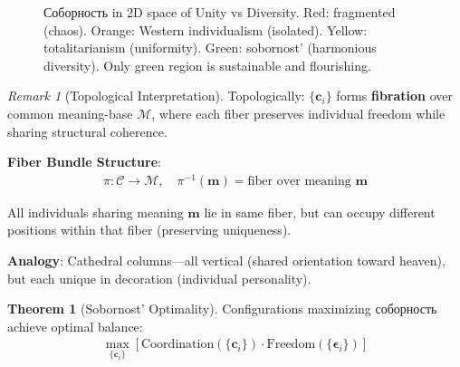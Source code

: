 \documentclass[11pt,a4paper]{article}
\theoremstyle{definition}
\newtheorem{theorem}{Theorem}[section]
\theoremstyle{remark}
\newtheorem{remark}{Remark}[section]
\newcommand{\CC}{\mathcal{C}}
\newcommand{\cc}{\mathbf{c}}
\begin{document}
\begin{enumerate}
\begin{figure}[H]
\caption{Соборность in 2D space of Unity vs Diversity. Red: fragmented (chaos). Orange: Western individualism (isolated). Yellow: totalitarianism (uniformity). Green: sobornost' (harmonious diversity). Only green region is sustainable and flourishing.}
\label{fig:sobornost_space}
\end{figure}

\begin{remark}[Topological Interpretation]
Topologically: \(\{\cc_i\}\) forms \textbf{fibration} over common meaning-base \(\mathcal{M}\), where each fiber preserves individual freedom while sharing structural coherence.

\textbf{Fiber Bundle Structure}:
\begin{align}
\pi: \CC \to \mathcal{M}, \quad \pi^{-1}(\mathbf{m}) = \text{fiber over meaning } \mathbf{m}
\end{align}

All individuals sharing meaning \(\mathbf{m}\) lie in same fiber, but can occupy different positions within that fiber (preserving uniqueness).

\textbf{Analogy}: Cathedral columns—all vertical (shared orientation toward heaven), but each unique in decoration (individual personality).
\end{remark}

\begin{theorem}[Sobornost' Optimality]
Configurations maximizing соборность achieve optimal balance:
\begin{align}
\max_{\{\cc_i\}} \left[ \text{Coordination}(\{\cc_i\}) \cdot \text{Freedom}(\{\boldsymbol{\epsilon}_i\}) \right]
\end{align}


\end{theorem}
\end{enumerate}
\end{document}
